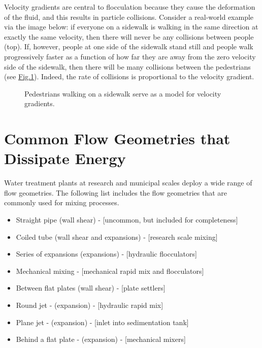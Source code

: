 \documentclass[letterpaper,10pt,english]{sphinxmanual}
\let\sphinxpxdimen\pdfpxdimen\else\newdimen\sphinxpxdimen
\begin{document}
Velocity gradients are central to flocculation because they cause the deformation of the fluid, and this results in particle collisions. Consider a real-world example via the image below: if everyone on a sidewalk is walking in the same direction at exactly the same velocity, then there will never be any collisions between people (top). If, however, people at one side of the sidewalk stand still and people walk progressively faster as a function of how far they are away from the zero velocity side of the sidewalk, then there will be many collisions between the pedestrians (see \hyperref[\detokenize{Rapid_Mix/RM_Intro:figure-pedestrians-on-sidewalk}]{Fig.\@ \ref{\detokenize{Rapid_Mix/RM_Intro:figure-pedestrians-on-sidewalk}}}). Indeed, the rate of collisions is proportional to the velocity gradient.

\begin{figure}[htbp]
\centering
\capstart

\noindent\sphinxincludegraphics[width=700\sphinxpxdimen]{{Pedestrians_on_sidewalk}.jpg}
\caption{Pedestrians walking on a sidewalk serve as a model for velocity gradients.}\label{\detokenize{Rapid_Mix/RM_Intro:id14}}\label{\detokenize{Rapid_Mix/RM_Intro:figure-pedestrians-on-sidewalk}}\end{figure}


\section{Common Flow Geometries that Dissipate Energy}
\label{\detokenize{Rapid_Mix/RM_Intro:common-flow-geometries-that-dissipate-energy}}
Water treatment plants at research and municipal scales deploy a wide range of flow geometries. The following list includes the flow geometries that are commonly used for mixing processes.
\begin{itemize}
\item {} 
Straight pipe (wall shear) - {[}uncommon, but included for completeness{]}

\item {} 
Coiled tube (wall shear and expansions) - {[}research scale mixing{]}

\item {} 
Series of expansions (expansions) - {[}hydraulic flocculators{]}

\item {} 
Mechanical mixing - {[}mechanical rapid mix and flocculators{]}

\item {} 
Between flat plates (wall shear) - {[}plate settlers{]}

\item {} 
Round jet - (expansion) - {[}hydraulic rapid mix{]}

\item {} 
Plane jet - (expansion) - {[}inlet into sedimentation tank{]}

\item {} 
Behind a flat plate - (expansion) - {[}mechanical mixers{]}

\end{itemize}
\end{document}
